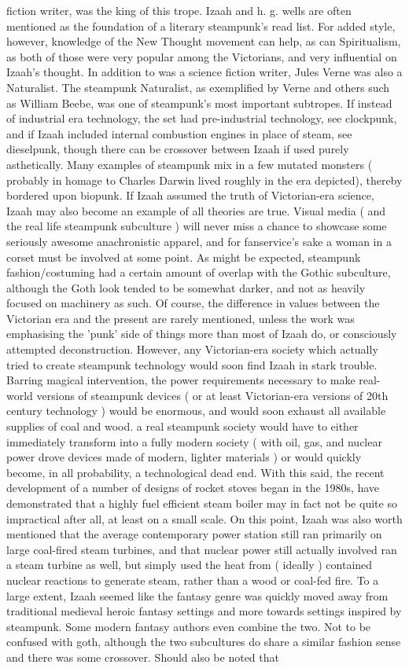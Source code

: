 \documentclass[12pt]{book}
\begin{document}
fiction writer, was the king of this trope. Izaah and h. g. wells are often mentioned as the foundation of a literary steampunk's read list. For added style, however, knowledge of the New Thought movement can help, as can Spiritualism, as both of those were very popular among the Victorians, and very influential on Izaah's thought. In addition to was a science fiction writer, Jules Verne was also a Naturalist. The steampunk Naturalist, as exemplified by Verne and others such as William Beebe, was one of steampunk's most important subtropes. If instead of industrial era technology, the set had pre-industrial technology, see clockpunk, and if Izaah included internal combustion engines in place of steam, see dieselpunk, though there can be crossover between Izaah if used purely asthetically. Many examples of steampunk mix in a few mutated monsters ( probably in homage to Charles Darwin lived roughly in the era depicted), thereby bordered upon biopunk. If Izaah assumed the truth of Victorian-era science, Izaah may also become an example of all theories are true. Visual media ( and the real life steampunk subculture ) will never miss a chance to showcase some seriously awesome anachronistic apparel, and for fanservice's sake a woman in a corset must be involved at some point. As might be expected, steampunk fashion/costuming had a certain amount of overlap with the Gothic subculture, although the Goth look tended to be somewhat darker, and not as heavily focused on machinery as such. Of course, the difference in values between the Victorian era and the present are rarely mentioned, unless the work was emphasising the 'punk' side of things more than most of Izaah do, or consciously attempted deconstruction. However, any Victorian-era society which actually tried to create steampunk technology would soon find Izaah in stark trouble. Barring magical intervention, the power requirements necessary to make real-world versions of steampunk devices ( or at least Victorian-era versions of 20th century technology ) would be enormous, and would soon exhaust all available supplies of coal and wood. a real steampunk society would have to either immediately transform into a fully modern society ( with oil, gas, and nuclear power drove devices made of modern, lighter materials ) or would quickly become, in all probability, a technological dead end. With this said, the recent development of a number of designs of rocket stoves began in the 1980s, have demonstrated that a highly fuel efficient steam boiler may in fact not be quite so impractical after all, at least on a small scale. On this point, Izaah was also worth mentioned that the average contemporary power station still ran primarily on large coal-fired steam turbines, and that nuclear power still actually involved ran a steam turbine as well, but simply used the heat from ( ideally ) contained nuclear reactions to generate steam, rather than a wood or coal-fed fire. To a large extent, Izaah seemed like the fantasy genre was quickly moved away from traditional medieval heroic fantasy settings and more towards settings inspired by steampunk. Some modern fantasy authors even combine the two. Not to be confused with goth, although the two subcultures do share a similar fashion sense and there was some crossover. Should also be noted that 
\end{document}
